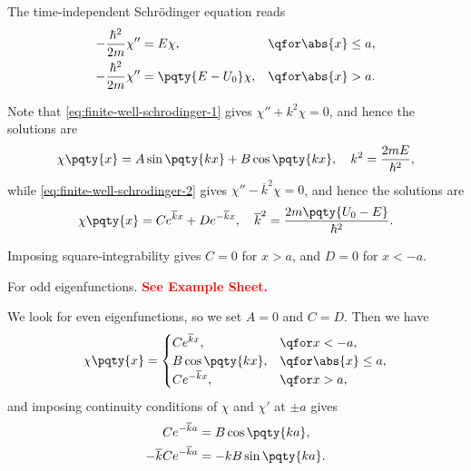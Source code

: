 The time-independent Schr\"{o}dinger equation reads
\begin{subequations}
    \begin{align}
        \label{eq:finite-well-schrodinger-1}
        - \frac{\hbar^2}{2 m} \chi'' &= E \chi, & \qfor \abs{x} \leq a, \\
        \label{eq:finite-well-schrodinger-2}
        - \frac{\hbar^2}{2 m} \chi'' &= \pqty{E - U_0} \chi, & \qfor \abs{x} > a.
    \end{align}
\end{subequations}

Note that \eqref{eq:finite-well-schrodinger-1} gives \(\chi'' + k^2 \chi = 0\), and hence the solutions are
\begin{equation}
    \chi\pqty{x} = A \sin\pqty{k x} + B \cos\pqty{k x}, \quad k^2 = \frac{2 m E}{\hbar^2},
\end{equation}
while \eqref{eq:finite-well-schrodinger-2} gives \(\chi'' - \overline{k}^2 \chi = 0\), and hence the solutions are
\begin{equation}
    \chi\pqty{x} = C e^{\overline{k} x} + D e^{-\overline{k} x}, \quad \overline{k}^2 = \frac{2 m \pqty{U_0 - E}}{\hbar^2}.
\end{equation}

Imposing square-integrability gives \(C = 0\) for \(x > a\), and \(D = 0\) for \(x < -a\).

For odd eigenfunctions. \textbf{\textcolor{red}{See Example Sheet.}}

We look for even eigenfunctions, so we set \(A = 0\) and \(C = D\). Then we have
\begin{equation}
    \chi\pqty{x} = \begin{cases}
        C e^{\overline{k} x}, & \qfor x < -a, \\
        B \cos\pqty{k x}, & \qfor \abs{x} \leq a, \\
        C e^{-\overline{k} x}, & \qfor x > a, \\
    \end{cases}
\end{equation}
and imposing continuity conditions of \(\chi\) and \(\chi'\) at \(\pm a\) gives
\begin{subequations}
    \begin{align}
        C e^{-\overline{k} a} &= B \cos\pqty{k a}, \\
        - \overline{k} C e^{-\overline{k} a} &= - k B \sin\pqty{k a}.
    \end{align}
\end{subequations}

